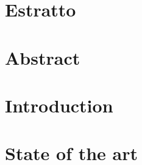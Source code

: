\documentclass[12pt,a4paper,twoside,openright]{report}
\makeatletter
\def\cleardoublepage{\clearpage\if@twoside \ifodd\c@page\else
\hbox{}
\vspace*{\fill}
\begin{center}
\end{center}
\vspace{\fill}
\thispagestyle{empty}
\newpage
\if@twocolumn\hbox{}\newpage\fi\fi\fi}
\makeatother
\begin{document}
\setcounter{page}{1}
\pagestyle{empty}



\pagestyle{fancy}
\renewcommand{\contentsname}{Table of Contents}%

\chapter*{Estratto}


\chapter*{Abstract}


\tableofcontents
\cleardoublepage
\listoffigures
\listoftables


\setcounter{page}{1}

\chapter{Introduction}
\label{chap:one}


\chapter{State of the art}
\label{chap:sota}

\end{document}
